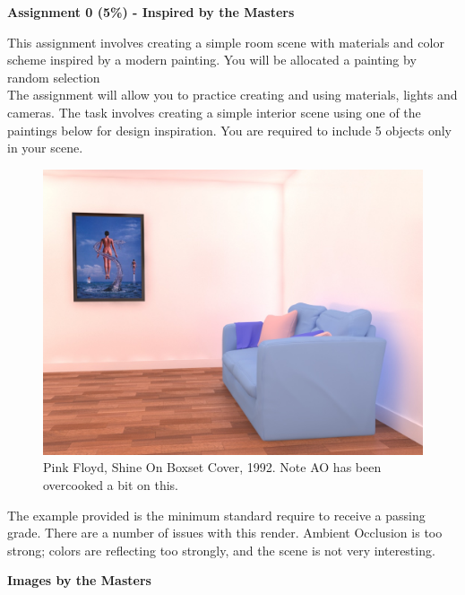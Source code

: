 
	
\begin{flushleft}
\Large\textbf{Assignment 0 (5\%) - Inspired by the Masters }\\
\end{flushleft}

This assignment involves creating a simple room scene with materials and color scheme inspired by a modern painting.  You will be allocated a painting by random selection\\


The assignment will allow you to practice creating and using materials, lights and cameras.  The task involves creating a simple interior scene using one of the paintings below for design inspiration.  You are required to include 5 objects only in your scene.  



\begin{figure}[h]
	\centering
	\includegraphics[width=12cm]{inspire/ShineOnRender.jpg}
	\caption{Pink Floyd, Shine On Boxset Cover, 1992.  Note AO has been overcooked a bit on this.}
	\label{fig:ShineOnRender}
\end{figure}

The example provided is the minimum standard require to receive a passing grade.  There are a number of issues with this render.  Ambient Occlusion is too strong; colors are reflecting too strongly, and the scene is not very interesting.


\vspace{1cm}

\textbf{Images by the Masters}

